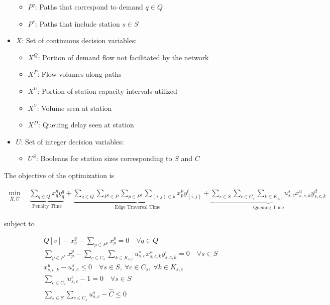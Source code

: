 \documentclass[12pt]{article}
\begin{document}
\begin{itemize}
\begin{itemize}
		\item $P^q$: Paths that correspond to demand $q \in Q$
		\item $P^s$: Paths that include station $s \in S$
	\end{itemize}
	\item $X$: Set of continuous decision variables: \begin{itemize}
		\item $X^Q$: Portion of demand flow not facilitated by the network
		\item $X^P$: Flow volumes along paths
		\item $X^U$: Portion of station capacity intervals utilized
		\item $X^V$: Volume seen at station
		\item $X^D$: Queuing delay seen at station
	\end{itemize}
	\item $U$: Set of integer decision variables: \begin{itemize}
		\item $U^S$: Booleans for station sizes corresponding to $S$ and $C$
	\end{itemize}
\end{itemize}


The objective of the optimization is

\begin{gather}
	\min_{\overline{X},\overline{U}}\quad \underbrace{\sum_{q \in Q} x^q_qy^q_q}_{\text{Penalty Time}} + \underbrace{\sum_{q \in Q}\sum_{P^q \in P}\sum_{p \in P^q}\sum_{(i, j) \in p} x^p_py^t_{(i, j)}}_{\text{Edge Traversal Time}} + \underbrace{\sum_{s \in S}\sum_{c \in C_s}
	\sum_{k \in K_{s, c}} u^s_{s, c}x^u_{s, c, k}y^d_{s, c, k}}_{\text{Queuing Time}} \label{eq:tm:obj}
\end{gather}

subject to

\begin{gather}
	Q[v] - x^q_q - \sum_{p \in P^q}x^p_p = 0 \quad \forall q \in Q \label{eq:tm:flow_dem} \\
	\sum_{p \in P^s} x^p_p - \sum_{c \in C_s}
	\sum_{k \in K_{s, c}} u^s_{s, c}x^u_{s, c, k}y^v_{s, c, k} = 0 \quad \forall s \in S \label{eq:tm:flow_cons} \\
	x^u_{s, c, k} - u^s_{s, c} \leq 0 \quad \forall s \in S, \ \forall c \in C_s,\ \forall k\in K_{s, c} \label{eq:tm:sz_int} \\
	\sum_{c \in C_s} u^s_{s, c} - 1 = 0 \quad \forall s \in S \label{eq:tm:chg_unity} \\
	\sum_{s \in S}\sum_{c \in C_s} u^s_{s, c} - \hat{C} \leq 0 \label{eq:tm:chg_tot}
\end{gather}
\end{document}
